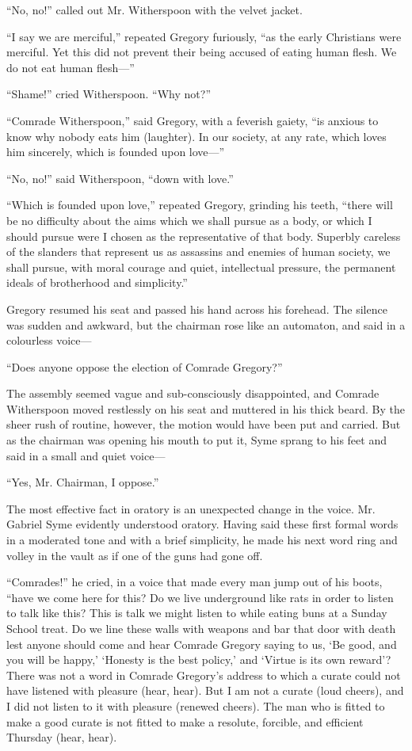 \documentclass{book}
\begin{document}
“No, no!” called out Mr. Witherspoon with the velvet jacket.

“I say we are merciful,” repeated Gregory furiously, “as the early Christians were merciful. Yet this did not prevent their being accused of eating human flesh. We do not eat human flesh—”

“Shame!” cried Witherspoon. “Why not?”

“Comrade Witherspoon,” said Gregory, with a feverish gaiety, “is anxious to know why nobody eats him (laughter). In our society, at any rate, which loves him sincerely, which is founded upon love—”

“No, no!” said Witherspoon, “down with love.”

“Which is founded upon love,” repeated Gregory, grinding his teeth, “there will be no difficulty about the aims which we shall pursue as a body, or which I should pursue were I chosen as the representative of that body. Superbly careless of the slanders that represent us as assassins and enemies of human society, we shall pursue, with moral courage and quiet, intellectual pressure, the permanent ideals of brotherhood and simplicity.”

Gregory resumed his seat and passed his hand across his forehead. The silence was sudden and awkward, but the chairman rose like an automaton, and said in a colourless voice—

“Does anyone oppose the election of Comrade Gregory?”

The assembly seemed vague and sub-consciously disappointed, and Comrade Witherspoon moved restlessly on his seat and muttered in his thick beard. By the sheer rush of routine, however, the motion would have been put and carried. But as the chairman was opening his mouth to put it, Syme sprang to his feet and said in a small and quiet voice—

“Yes, Mr. Chairman, I oppose.”

The most effective fact in oratory is an unexpected change in the voice. Mr. Gabriel Syme evidently understood oratory. Having said these first formal words in a moderated tone and with a brief simplicity, he made his next word ring and volley in the vault as if one of the guns had gone off.

“Comrades!” he cried, in a voice that made every man jump out of his boots, “have we come here for this? Do we live underground like rats in order to listen to talk like this? This is talk we might listen to while eating buns at a Sunday School treat. Do we line these walls with weapons and bar that door with death lest anyone should come and hear Comrade Gregory saying to us, ‘Be good, and you will be happy,’ ‘Honesty is the best policy,’ and ‘Virtue is its own reward’? There was not a word in Comrade Gregory’s address to which a curate could not have listened with pleasure (hear, hear). But I am not a curate (loud cheers), and I did not listen to it with pleasure (renewed cheers). The man who is fitted to make a good curate is not fitted to make a resolute, forcible, and efficient Thursday (hear, hear).
\end{document}

